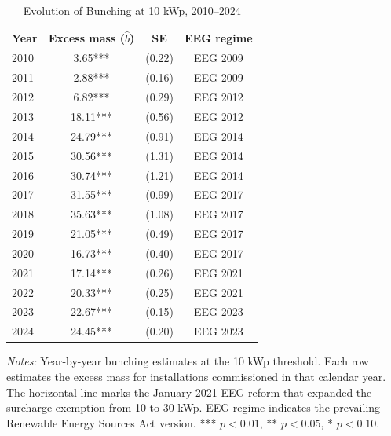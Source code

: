 \begin{table}[t]
\centering
\caption{Evolution of Bunching at 10 kWp, 2010--2024}
\label{tab:event_study}
\begin{threeparttable}
\begin{tabular}{lccc}
\toprule
Year & Excess mass ($\hat{b}$) & SE & EEG regime \\
\midrule
2010 & 3.65*** & (0.22) & EEG 2009 \\
2011 & 2.88*** & (0.16) & EEG 2009 \\
2012 & 6.82*** & (0.29) & EEG 2012 \\
2013 & 18.11*** & (0.56) & EEG 2012 \\
2014 & 24.79*** & (0.91) & EEG 2014 \\
2015 & 30.56*** & (1.31) & EEG 2014 \\
2016 & 30.74*** & (1.21) & EEG 2014 \\
2017 & 31.55*** & (0.99) & EEG 2017 \\
2018 & 35.63*** & (1.08) & EEG 2017 \\
2019 & 21.05*** & (0.49) & EEG 2017 \\
2020 & 16.73*** & (0.40) & EEG 2017 \\
\midrule
2021 & 17.14*** & (0.26) & EEG 2021 \\
2022 & 20.33*** & (0.25) & EEG 2021 \\
2023 & 22.67*** & (0.15) & EEG 2023 \\
2024 & 24.45*** & (0.20) & EEG 2023 \\
\bottomrule
\end{tabular}
\begin{tablenotes}[flushleft]\footnotesize
\item \textit{Notes:} Year-by-year bunching estimates at the 10 kWp threshold. Each row estimates the excess mass for installations commissioned in that calendar year. The horizontal line marks the January 2021 EEG reform that expanded the surcharge exemption from 10 to 30 kWp. EEG regime indicates the prevailing Renewable Energy Sources Act version. *** $p<0.01$, ** $p<0.05$, * $p<0.10$.
\end{tablenotes}
\end{threeparttable}
\end{table}
